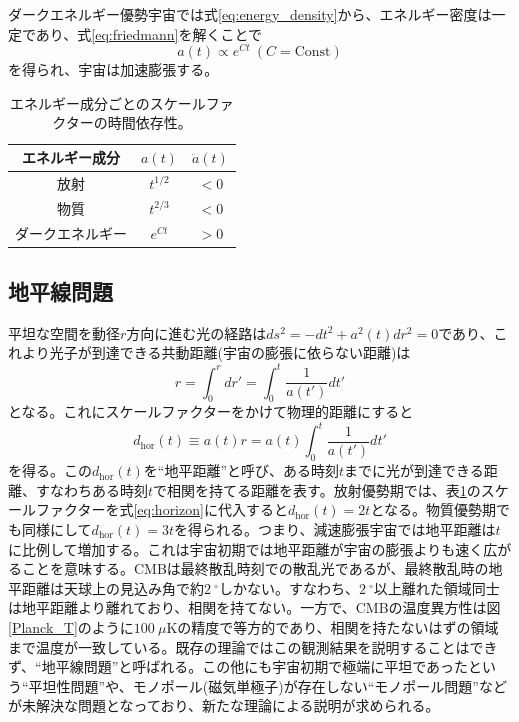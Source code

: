 ダークエネルギー優勢宇宙では式\eqref{eq:energy_density}から、エネルギー密度は一定であり、式\eqref{eq:friedmann}を解くことで
\begin{equation}
  a(t) \propto e^{Ct} ~ (C = \mathrm{Const})
\end{equation}
を得られ、宇宙は加速膨張する。
\begin{table}[htbp]
  \centering
  \caption{エネルギー成分ごとのスケールファクターの時間依存性。}
  \vspace{3mm}
  \begin{tabular}{ccc} \hline
    エネルギー成分 & $a(t)$ & $\ddot{a}(t)$ \\ \hline
    放射 & $t^{1/2}$ & $< 0$ \\
    物質 & $t^{2/3}$ & $< 0$ \\
    ダークエネルギー & $e^{Ct}$ & $> 0$ \\ \hline
  \end{tabular}
  \label{rad_vs_mat}
\end{table}

\subsection{地平線問題}
平坦な空間を動径$r$方向に進む光の経路は$ds^{2} = -dt^{2} + a^{2}(t)dr^{2} = 0$であり、これより光子が到達できる共動距離(宇宙の膨張に依らない距離)は
\begin{equation}
  r = \int_{0}^{r}dr' = \int_{0}^{t}\frac{1}{a(t')}dt'
\end{equation}
となる。これにスケールファクターをかけて物理的距離にすると
\begin{equation}
  d_{\mathrm{hor}}(t)\equiv a(t)r = a(t)\int_{0}^{t}\frac{1}{a(t')}dt' \label{eq:horizon}
\end{equation}
を得る。この$d_{\mathrm{hor}}(t)$を``地平距離''と呼び、ある時刻$t$までに光が到達できる距離、すなわちある時刻$t$で相関を持てる距離を表す。放射優勢期では、表\ref{rad_vs_mat}のスケールファクターを式\eqref{eq:horizon}に代入すると$d_{\mathrm{hor}}(t) = 2t$となる。物質優勢期でも同様にして$d_{\mathrm{hor}}(t) = 3t$を得られる。つまり、減速膨張宇宙では地平距離は$t$に比例して増加する。これは宇宙初期では地平距離が宇宙の膨張よりも速く広がることを意味する。CMBは最終散乱時刻での散乱光であるが、最終散乱時の地平距離は天球上の見込み角で約$\SI{2}{^{\circ}}$しかない。すなわち、$\SI{2}{^{\circ}}$以上離れた領域同士は地平距離より離れており、相関を持てない。一方で、CMBの温度異方性は図\ref{Planck_T}のように$\SI{100}{\mu\mathrm{K}}$の精度で等方的であり、相関を持たないはずの領域まで温度が一致している。既存の理論ではこの観測結果を説明することはできず、``地平線問題''と呼ばれる。この他にも宇宙初期で極端に平坦であったという``平坦性問題''や、モノポール(磁気単極子)が存在しない``モノポール問題''などが未解決な問題となっており、新たな理論による説明が求められる。

